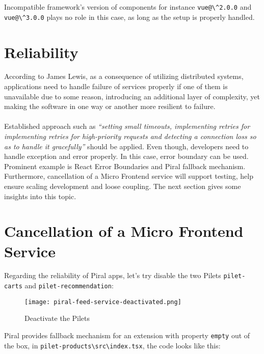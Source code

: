 \documentclass[a4paper]{book}
\begin{document}
Incompatible framework's version of components for instance \verb|vue@\^2.0.0| and \verb|vue@\^3.0.0| plays no role in this case, as long as the setup is properly handled.

\section{Reliability}
According to James Lewis, as a consequence of utilizing distributed systems, applications need to handle failure of services properly if one of them is unavailable due to some reason, introducing an additional layer of complexity, yet making the software in one way or another more resilient to failure. \cite{Lew14}
\\ \\
Established approach such as \textit{“setting small timeouts, implementing retries for implementing retries for high-priority requests and detecting a connection loss so as to handle it gracefully”} \cite{Rap20} should be applied. Even though, developers need to handle exception and error properly. In this case, error boundary can be used. Prominent example is React Error Boundaries \cite{ReactErrorBundaries} and Piral fallback mechanism. Furthermore, cancellation of a Micro Frontend service will support testing, help ensure scaling development and loose coupling. The next section gives some insights into this topic.

\section{Cancellation of a Micro Frontend Service}
Regarding the reliability of Piral apps, let's try disable the two Pilets \verb|pilet-carts| and \verb|pilet-recommendation|:
\begin{figure}[h!]
  \centering
  \captionsetup{justification=centering}
  \texttt{[image: piral-feed-service-deactivated.png]}
  \caption{Deactivate the Pilets}
  \label{fig:piral-feed-service-deactivated}
\end{figure}

Piral provides fallback mechanism for an extension with property \verb|empty| out of the box, in \verb|pilet-products\src\index.tsx|, the code looks like this:
\end{document}

